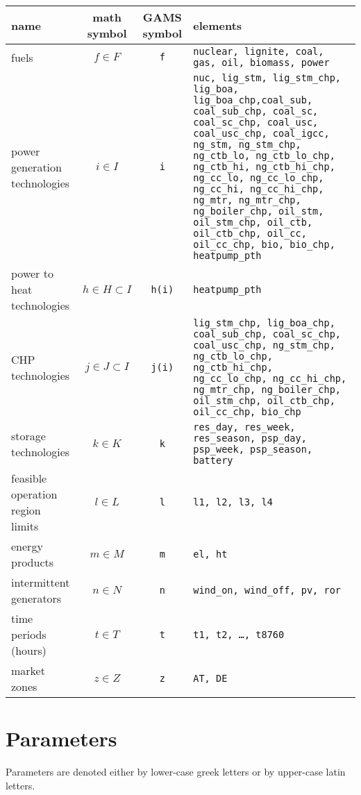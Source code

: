 \documentclass[11pt,a4paper]{article}
\begin{document}
\begin{longtable}{p{3.6cm} c c p{6cm}}
\hline
\textbf{name} & \makecell[l]{\textbf{math} \\ \textbf{symbol}} & \makecell[l]{\textbf{GAMS} \\\textbf{symbol}} & \textbf{elements} \\
\hline \hline
fuels & $f \in F$ & \texttt{f} & \texttt{nuclear, lignite, coal, gas, oil, biomass, power} \\ \hline
power generation technologies & $i \in I$ & \texttt{i} & 
\texttt{nuc, lig\_stm, lig\_stm\_chp, lig\_boa, lig\_boa\_chp,coal\_sub, coal\_sub\_chp, coal\_sc, coal\_sc\_chp, coal\_usc, coal\_usc\_chp, coal\_igcc, ng\_stm, 
ng\_stm\_chp, ng\_ctb\_lo, ng\_ctb\_lo\_chp, ng\_ctb\_hi, ng\_ctb\_hi\_chp, ng\_cc\_lo, ng\_cc\_lo\_chp, ng\_cc\_hi, ng\_cc\_hi\_chp, ng\_mtr, ng\_mtr\_chp, 
ng\_boiler\_chp, oil\_stm, oil\_stm\_chp, oil\_ctb, oil\_ctb\_chp, oil\_cc, oil\_cc\_chp, bio, bio\_chp, heatpump\_pth} \\ \hline
power to heat technologies & $h \in H \subset I$ & \texttt{h(i)} & \texttt{heatpump\_pth}  \\ \hline
CHP technologies & $j \in J \subset I$ & \texttt{j(i)} & \texttt{lig\_stm\_chp, lig\_boa\_chp, coal\_sub\_chp, coal\_sc\_chp, coal\_usc\_chp, ng\_stm\_chp, 
ng\_ctb\_lo\_chp, ng\_ctb\_hi\_chp, ng\_cc\_lo\_chp, ng\_cc\_hi\_chp, ng\_mtr\_chp, ng\_boiler\_chp, oil\_stm\_chp, oil\_ctb\_chp, oil\_cc\_chp, bio\_chp} \\ \hline
storage technologies & $k \in K$ & \texttt{k} & \texttt{res\_day, res\_week, res\_season, psp\_day, psp\_week, psp\_season, battery} \\ \hline
feasible operation region limits & $l \in L$ & \texttt{l} & \texttt{l1, l2, l3, l4} \\ \hline
energy products & $m \in M$ & \texttt{m} & \texttt{el, ht} \\ \hline
intermittent generators & $n \in N$ & \texttt{n} & \texttt{wind\_on, wind\_off, pv, ror}\\ \hline
time periods (hours) & $t \in T$ & \texttt{t} & \texttt{t1, t2, \ldots, t8760} \\ \hline
market zones & $z \in Z$ & \texttt{z} & \texttt{AT, DE} \\ \hline \hline
\end{longtable}

\section{Parameters} \label{parameters}
Parameters are denoted either by lower-case greek letters or by upper-case latin letters.
\end{document}
